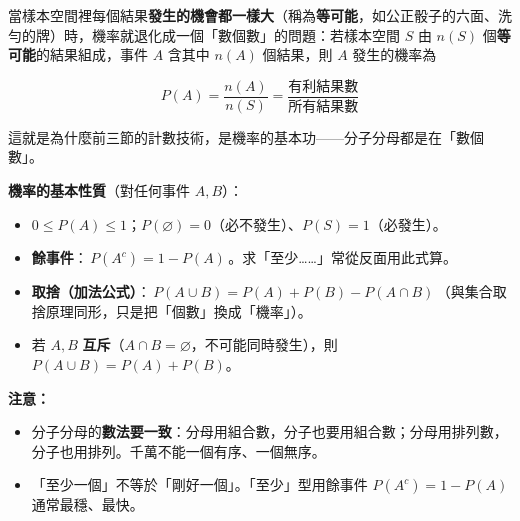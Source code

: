 \documentclass[11pt]{article}
\begin{document}
當樣本空間裡每個結果\textbf{發生的機會都一樣大}（稱為\textbf{等可能}，如公正骰子的六面、洗勻的牌）時，機率就退化成一個「數個數」的問題：若樣本空間 $S$ 由 $n(S)$ 個\textbf{等可能}的結果組成，事件 $A$ 含其中 $n(A)$ 個結果，則 $A$ 發生的機率為

$$\boxed{\,P(A)=\dfrac{n(A)}{n(S)}=\dfrac{\text{有利結果數}}{\text{所有結果數}}\,}$$

這就是為什麼前三節的計數技術，是機率的基本功——分子分母都是在「數個數」。


\textbf{機率的基本性質}（對任何事件 $A,B$）：
\begin{itemize}\setlength{\itemsep}{2pt}
\item $0\le P(A)\le 1$；$P(\varnothing)=0$（必不發生）、$P(S)=1$（必發生）。
\item \textbf{餘事件}：$\boxed{\,P(A^c)=1-P(A)\,}$。求「至少……」常從反面用此式算。
\item \textbf{取捨（加法公式）}：$\boxed{\,P(A\cup B)=P(A)+P(B)-P(A\cap B)\,}$（與集合取捨原理同形，只是把「個數」換成「機率」）。
\item 若 $A,B$ \textbf{互斥}（$A\cap B=\varnothing$，不可能同時發生），則 $P(A\cup B)=P(A)+P(B)$。
\end{itemize}

\textbf{注意：}
\begin{itemize}\setlength{\itemsep}{1pt}
\item 分子分母的\textbf{數法要一致}：分母用組合數，分子也要用組合數；分母用排列數，分子也用排列。千萬不能一個有序、一個無序。
\item 「至少一個」不等於「剛好一個」。「至少」型用餘事件 $P(A^c)=1-P(A)$ 通常最穩、最快。
\end{itemize}
\end{document}
